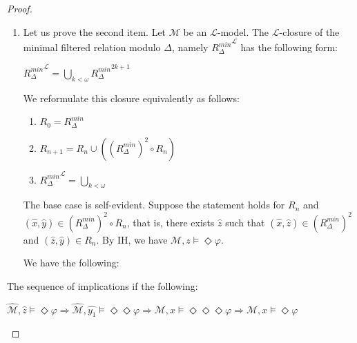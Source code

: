 \documentclass[a4paper]{article}
\theoremstyle{defin}
\theoremstyle{theorem}
\theoremstyle{prop}
\theoremstyle{lemma}
\theoremstyle{fact}
\theoremstyle{ex}
\theoremstyle{col}
\theoremstyle{claim}
\begin{document}
\begin{proof}
\begin{enumerate}
  \item Let us prove the second item. Let $\mathcal{M}$ be an $\mathcal{L}$-model.
  The $\mathcal{L}$-closure of the minimal filtered relation modulo $\Delta$, namely ${R_{\Delta}^{min}}^{\mathcal{L}}$ has the following form:
  \begin{center}
    ${R_{\Delta}^{min}}^{\mathcal{L}} = \bigcup \limits_{k < \omega} {R_{\Delta}^{min}}^{2k + 1}$
  \end{center}
  We reformulate this closure equivalently as follows:
  \begin{enumerate}
    \item $R_0 = R_{\Delta}^{min}$
    \item $R_{n + 1} = R_n \cup ((R_{\Delta}^{min})^2 \circ R_n)$
    \item ${R_{\Delta}^{min}}^{\mathcal{L}} = \bigcup \limits_{k < \omega}$
  \end{enumerate}

  The base case is self-evident. Suppose the statement holds for $R_{n}$ and $(\hat{x}, \hat{y}) \in (R_{\Delta}^{min})^2 \circ R_n$, that is, there exists $\hat{z}$ such that $(\hat{x}, \hat{z}) \in (R_{\Delta}^{min})^2$ and $(\hat{z}, \hat{y}) \in R_n$. By IH, we have $\mathcal{M}, z \models \Diamond \varphi$.

  We have the following:

\end{enumerate}
  The sequence of implications if the following:
  \begin{center}
    $\widehat{\mathcal{M}}, \hat{z} \models \Diamond \varphi \Rightarrow \widehat{\mathcal{M}}, \widehat{y_1} \models \Diamond \Diamond \varphi \Rightarrow \mathcal{M}, x \models \Diamond \Diamond \Diamond \varphi \Rightarrow \mathcal{M}, x \models \Diamond \varphi$
  \end{center}
\end{proof}
\end{document}

